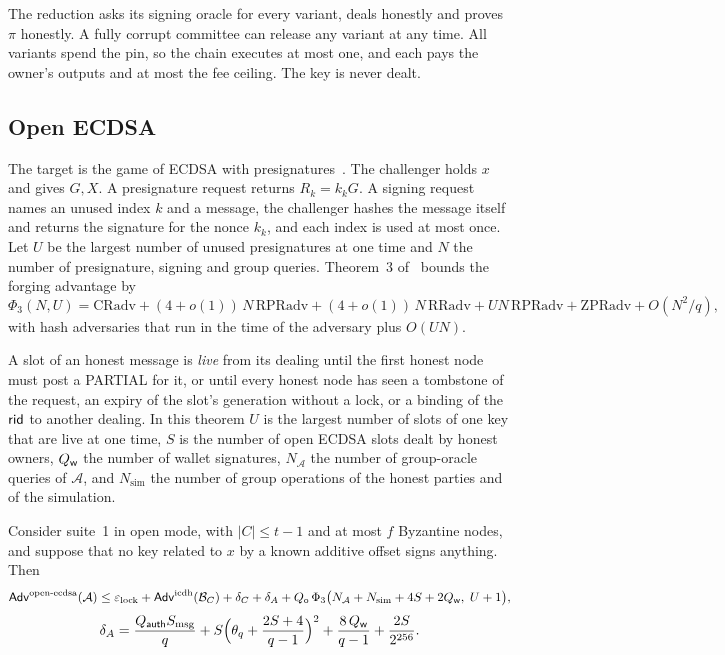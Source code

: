 The reduction asks its signing oracle for every variant, deals honestly and proves $\pi$ honestly. A fully corrupt committee can release any variant at any time. All variants spend the pin, so the chain executes at most one, and each pays the owner's outputs and at most the fee ceiling. The key is never dealt.

\subsection{Open ECDSA}\label{sec:sec-ecdsa}

The target is the game of ECDSA with presignatures~\cite[Figure~4]{GS21}. The challenger holds $x$ and gives $G, X$. A presignature request returns $R_k = k_k G$. A signing request names an unused index $k$ and a message, the challenger hashes the message itself and returns the signature for the nonce $k_k$, and each index is used at most once. Let $U$ be the largest number of unused presignatures at one time and $N$ the number of presignature, signing and group queries. Theorem~3 of~\cite{GS21} bounds the forging advantage by
\[
  \Phi_3(N, U) = \mathrm{CRadv} + (4 + o(1))\,N\,\mathrm{RPRadv} + (4 + o(1))\,N\,\mathrm{RRadv} + U N\,\mathrm{RPRadv} + \mathrm{ZPRadv} + O(N^2/q),
\]
with hash adversaries that run in the time of the adversary plus $O(UN)$.

A slot of an honest message is \emph{live} from its dealing until the first honest node must post a PARTIAL for it, or until every honest node has seen a tombstone of the request, an expiry of the slot's generation without a lock, or a binding of the $\mathsf{rid}$ to another dealing. In this theorem $U$ is the largest number of slots of one key that are live at one time, $S$ is the number of open ECDSA slots dealt by honest owners, $Q_{\mathsf{w}}$ the number of wallet signatures, $N_{\mathcal{A}}$ the number of group-oracle queries of $\mathcal{A}$, and $N_{\mathrm{sim}}$ the number of group operations of the honest parties and of the simulation.

\begin{theorem}\label{thm:ecdsa}
Consider suite~1 in open mode, with $|C| \le t-1$ and at most $f$ Byzantine nodes, and suppose that no key related to $x$ by a known additive offset signs anything. Then
\[
  \mathsf{Adv}^{\mathrm{open\text{-}ecdsa}}(\mathcal{A}) \le \varepsilon_{\mathrm{lock}} + \mathsf{Adv}^{\mathrm{icdh}}(\mathcal{B}_C) + \delta_C + \delta_A + Q_{\mathsf{o}}\,\Phi_3\bigl(N_{\mathcal{A}} + N_{\mathrm{sim}} + 4S + 2Q_{\mathsf{w}},\; U + 1\bigr),
\]
\[
  \delta_A = \frac{Q_{\mathsf{auth}} S_{\mathrm{msg}}}{q} + S\Bigl(\theta_q + \frac{2S + 4}{q - 1}\Bigr)^{2} + \frac{8\,Q_{\mathsf{w}}}{q-1} + \frac{2S}{2^{256}} .
\]
\end{theorem}

